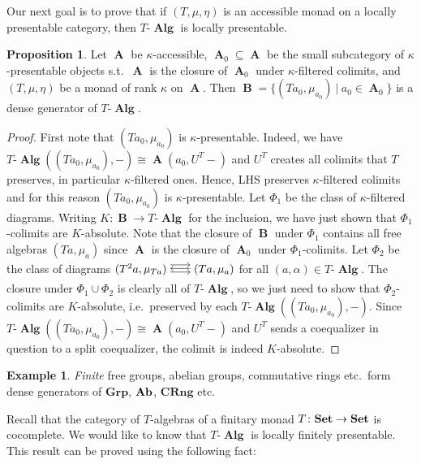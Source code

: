 \documentclass[a4paper,11pt,fullpage,oneside,openany]{amsbook}
\newcommand{\catname}[1]{{\normalfont\textbf{#1}}}
\DeclareMathOperator{\Alg}{\mathbf{Alg}}
\newcommand{\Set}{\catname{Set}}
\newcommand{\Ab}{\catname{Ab}}
\DeclareMathOperator{\A}{\mathbf{A}}
\DeclareMathOperator{\B}{\mathbf{B}}
\theoremstyle{definition}
\theoremstyle{definition}
\newtheorem{exmp}[thm]{Example} %
\newtheorem{prop}[thm]{Proposition}
\theoremstyle{remark}
\begin{document}
Our next goal is to prove that if $(T,\mu,\eta)$ is an accessible monad on a locally presentable category, then $T\mbox{-}\Alg$ is locally presentable.
\begin{prop}
    Let $\A$ be $\kappa$-accessible, $\A_0\subseteq\A$ be the small subcategory of $\kappa$-presentable objects s.t.\ $\A$ is the closure of $\A_0$ under $\kappa$-filtered colimits, and $(T,\mu,\eta)$ be a monad of rank $\kappa$ on $\A$. Then $\B=\{ (Ta_0,\mu_{a_0})\ | \ a_0\in\A_0 \}$ is a dense generator of $T\mbox{-}\Alg$.
\end{prop}
\begin{proof}
	First note that $(Ta_0,\mu_{a_0})$ is $\kappa$-presentable. Indeed, we have $T\mbox{-}\Alg((Ta_0,\mu_{a_0}),-)\cong\A(a_0,U^T-)$ and $U^T$ creates all colimits that $T$ preserves, in particular $\kappa$-filtered ones. Hence, LHS preserves $\kappa$-filtered colimits and for this reason $(Ta_0,\mu_{a_0})$ is $\kappa$-presentable. Let $\Phi_1$  be the class of $\kappa$-filtered diagrams. Writing $K\colon\B\to T\mbox{-}\Alg$ for the inclusion, we have just shown that $\Phi_1$-colimits are $K$-absolute. Note that the closure of $\B$ under $\Phi_1$ contains all free algebras $(Ta,\mu_a)$ since $\A$ is the closure of $\A_0$ under $\Phi_1$-colimits. Let $\Phi_2$ be the class of diagrams $\hspace{-1.5mm}\begin{tikzcd}
	(T^2a,\mu_{Ta})\hspace{-1.5mm}\arrow[r, shift right=.5ex, shorten <= .3em, shorten >= .3em]  \arrow[r, shift left=1ex, shorten <= .3em, shorten >= .3em] & \hspace{-1.5mm}(Ta,\mu_a)\arrow[l, shift right=.25ex, shorten <=.3em, shorten >=.3em]
	\end{tikzcd}\hspace{-1.5mm}$ for all $(a,\alpha)\in T\mbox{-}\Alg$. The closure under $\Phi_1\cup\Phi_2$ is clearly all of $T\mbox{-}\Alg$, so we just need to show that $\Phi_2$-colimits are $K$-absolute, i.e.\ preserved by each $T\mbox{-}\Alg((Ta_0,\mu_{a_0}),-)$. Since $T\mbox{-}\Alg((Ta_0,\mu_{a_0}),-)\cong\A(a_0, U^T-)$ and $U^T$ sends a coequalizer in question to a split coequalizer, the colimit is indeed $K$-absolute.
\end{proof}
\begin{exmp}
	\emph{Finite} free groups, abelian groups, commutative rings etc.\ form dense generators of $\mathbf{Grp}$, $\Ab$, $\mathbf{CRng}$ etc.
\end{exmp}
Recall that the category of $T$-algebras of a finitary monad $T\colon\Set\to\Set$ is cocomplete. We would like to know that $T\mbox{-}\Alg$ is locally finitely presentable. This result can be proved using the following fact:
\end{document}
